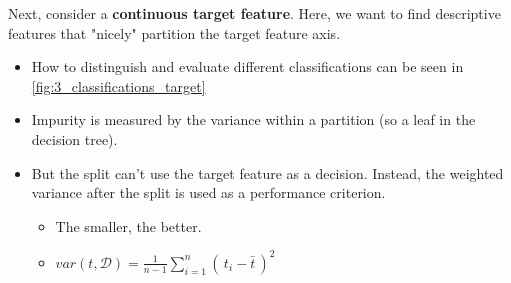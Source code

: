 Next, consider a \textbf{continuous target feature}. Here, we want to find descriptive features that "nicely" partition the target feature axis. 
\begin{itemize}
  \item How to distinguish and evaluate different classifications can be seen in \ref{fig:3_classifications_target}
  \item Impurity is measured by the variance within a partition (so a leaf in the decision tree). 
  \item But the split can't use the target feature as a decision. Instead, the weighted variance after the split is used as a performance criterion.
  \begin{itemize}
    \item The smaller, the better.
    \item $var(t, \mathcal{D}) = \frac{1}{n-1} \sum_{i=1}^{n}(\,t_i-\bar{t}\,)^2$
  \end{itemize}
\end{itemize}

